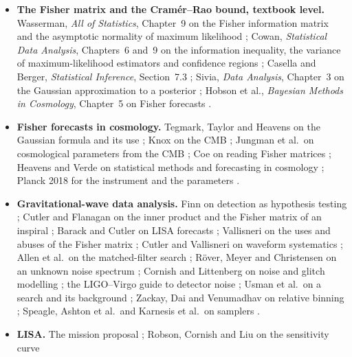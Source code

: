 \begin{itemize}[itemsep=2pt,leftmargin=1.2em]
  \item \textbf{The Fisher matrix and the Cram\'er--Rao bound, textbook level.} Wasserman, \emph{All of Statistics},
        Chapter~9 on the Fisher information matrix and the asymptotic normality of maximum likelihood
        ; Cowan, \emph{Statistical Data Analysis}, Chapters~6 and~9 on the information inequality,
        the variance of maximum-likelihood estimators and confidence regions ; Casella
        and Berger, \emph{Statistical Inference}, Section~7.3 ; Sivia, \emph{Data Analysis},
        Chapter~3 on the Gaussian approximation to a posterior ; Hobson et al., \emph{Bayesian
        Methods in Cosmology}, Chapter~5 on Fisher forecasts .
  \item \textbf{Fisher forecasts in cosmology.} Tegmark, Taylor and Heavens on the Gaussian formula and its use
        \cite{TTH1997}; Knox on the CMB \cite{Knox1995}; Jungman et al.\ on cosmological parameters from the CMB
        \cite{Jungman1996}; Coe on reading Fisher matrices \cite{Coe2009}; Heavens and Verde on statistical methods and
        forecasting in cosmology \cite{Heavens2009,Verde2010}; Planck 2018 for the instrument and the parameters \cite{Planck2018I,Planck2018VI}.
  \item \textbf{Gravitational-wave data analysis.} Finn on detection as hypothesis testing \cite{Finn1992}; Cutler and
        Flanagan on the inner product and the Fisher matrix of an inspiral \cite{CutlerFlanagan1994}; Barack and Cutler on
        LISA forecasts \cite{BarackCutler2004}; Vallisneri on the uses and abuses of the Fisher matrix
        \cite{Vallisneri2008}; Cutler and Vallisneri on waveform systematics \cite{CutlerVallisneri2007}; Allen et al.\ on the
        matched-filter search \cite{AllenFINDCHIRP2012}; R\"over, Meyer and Christensen on an unknown noise spectrum
        \cite{RoverMeyerChristensen2011}; Cornish and Littenberg on noise and glitch modelling \cite{CornishLittenberg2015};
        the LIGO--Virgo guide to detector noise \cite{LIGOGuide2020}; Usman et al.\ on a search and its background
        \cite{UsmanPyCBC2016}; Zackay, Dai and Venumadhav on relative binning \cite{ZackayDaiVenumadhav2018}; Speagle,
        Ashton et al.\ and Karnesis et al.\ on samplers \cite{Speagle2020,AshtonBilby2019,KarnesisEryn2023}.
  \item \textbf{LISA.} The mission proposal \cite{LISA2017}; Robson, Cornish and Liu on the sensitivity curve

\end{itemize}
